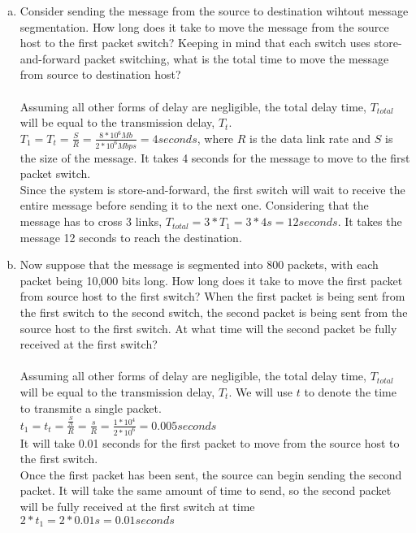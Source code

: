 \documentclass[11pt]{article}
\begin{document}
\begin{enumerate}[a.]
    \item Consider sending the message from the source to destination wihtout message segmentation. How long does it take to move the message from the source host to the first packet switch? Keeping in mind that each switch uses store-and-forward packet switching, what is the total time to move the message from source to destination host?\\\\
    \noindent
    Assuming all other forms of delay are negligible, the total delay time, $T_{total}$ will be equal to the transmission delay, $T_t$. \\
    \noindent
    $T_{1}=T_t=\frac{S}{R}=\frac{8*10^6 Mb}{2*10^6 Mbps}=4seconds$, where $R$ is the data link rate and $S$ is the size of the message. It takes 4 seconds for the message to move to the first packet switch.\\ Since the system is store-and-forward, the first switch will wait to receive the entire message before sending it to the next one. Considering that the message has to cross 3 links, $T_{total}=3*T_{1}=3*4s=12seconds$. It takes the message 12 seconds to reach the destination.\\
    \item Now suppose that the message is segmented into 800 packets, with each packet being 10,000 bits long. How long does it take to move the first packet from source host to the first switch? When the first packet is being sent from the first switch to the second switch, the second packet is being sent from the source host to the first switch. At what time will the second packet be fully received at the first switch?\\\\
    \noindent
    Assuming all other forms of delay are negligible, the total delay time, $T_{total}$ will be equal to the transmission delay, $T_t$. We will use $t$ to denote the time to transmite a single packet.\\
    \noindent
    $t_1=t_t=\frac{\frac{S}{N}}{R}=\frac{s}{R}=\frac{1*10^4}{2*10^6}=0.005seconds$\\
    It will take 0.01 seconds for the first packet to move from the source host to the first switch.\\
    Once the first packet has been sent, the source can begin sending the second packet. It will take the same amount of time to send, so the second packet will be fully received at the first switch at time $2*t_1=2*0.01s=0.01seconds$

\end{enumerate}
\end{document}
